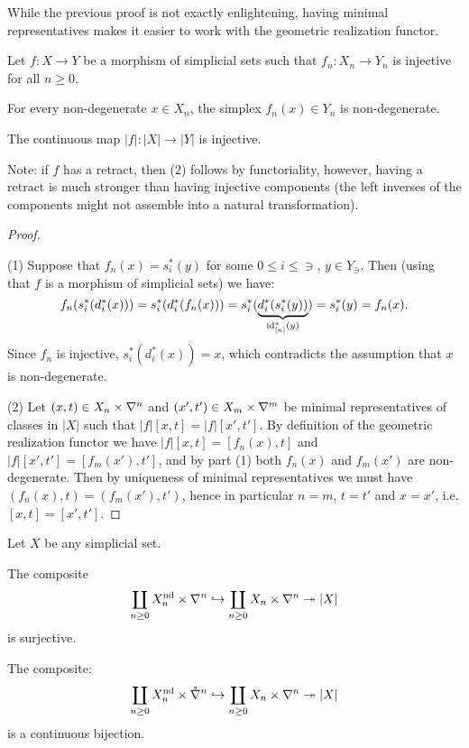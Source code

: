 While the previous proof is not exactly enlightening, having minimal representatives makes it easier to work with the geometric realization functor.

\begin{corollary}\label{corollary:criterion-for-injectivity-of-map-between-realizations}
Let $f:X\to Y$ be a morphism of simplicial sets such that $f_n:X_n\to Y_n$ is injective for all $n\ge0$.
\begin{numerate}
\item For every non-degenerate $x\in X_n$, the simplex $f_n(x)\in Y_n$ is non-degenerate.
\item The continuous map $|f|:|X|\to|Y|$ is injective.
\end{numerate}
\end{corollary}

Note: if $f$ has a retract, then (2) follows by functoriality, however, having a retract is much stronger than having injective components (the left inverses of the components might not assemble into a natural transformation).

\begin{proof}\ 

(1) Suppose that $f_n(x)=s_i^*(y)$ for some $0\le i\le\ni$, $y\in Y_\ni$. Then (using that $f$ is a morphism of simplicial sets) we have:
\[f_n(s_i^*(d_i^*(x)))=s_i^*(d_i^*(f_n(x)))=s_i^*(\underbrace{d_i^*(s_i^*(y))}_{\operatorname{id}_{[n]}^*(y)})=s_i^*(y)=f_n(x).\]
Since $f_n$ is injective, $s_i^*(d_i^*(x))=x$, which contradicts the assumption that $x$ is non-degenerate.

(2) Let $(x,t)\in X_n\times\nabla^n$ and $(x',t')\in X_m\times\nabla^{m}$ be minimal representatives of classes in $|X|$ such that $|f|[x,t]=|f|[x',t']$. By definition of the geometric realization functor we have $|f|[x,t]=[f_n(x),t]$ and $|f|[x',t']=[f_m(x'),t']$, and by part (1) both $f_n(x)$ and $f_m(x')$ are non-degenerate.
Then by uniqueness of minimal representatives we must have $(f_n(x),t)=(f_m(x'),t')$, hence in particular $n=m$, $t=t'$ and $x=x'$, i.e. $[x,t]=[x',t']$.
\end{proof}

\begin{corollary}\label{corollary:composition-of-realization}
Let $X$ be any simplicial set.
\begin{numerate}
\item The composite
\[\coprod_{n\ge0} X_n^\text{nd}\times\nabla^n\hookrightarrow\coprod_{n\ge0} X_n\times\nabla^n\twoheadrightarrow|X|\]
is surjective.
\item The composite:
\[\coprod_{n\ge0} X_n^\text{nd}\times\mathring\nabla^n\hookrightarrow\coprod_{n\ge0} X_n\times\nabla^n\twoheadrightarrow|X|\]
is a continuous bijection.
\end{numerate}
\end{corollary}


